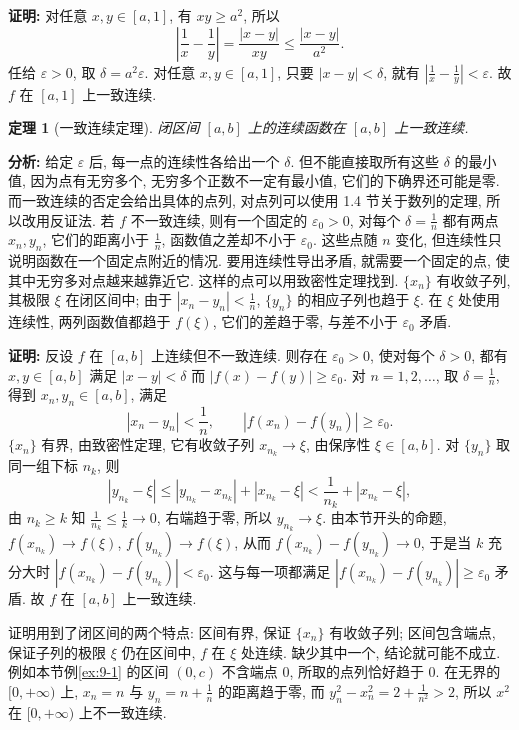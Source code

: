 \documentclass[UTF8,openany]{ctexbook}
\theoremstyle{chinesetextbook}
\newtheorem{theorem}{定理}[section]
\newenvironment{cnproof}{\par\indent\textbf{证明:} \ignorespaces}{\par}
\begin{document}
\begin{cnproof}
对任意 $x,y\in[a,1]$, 有 $xy\ge a^2$, 所以
\[
\left|\frac1x-\frac1y\right|=\frac{|x-y|}{xy}\le\frac{|x-y|}{a^2}.
\]
任给 $\varepsilon>0$, 取 $\delta=a^2\varepsilon$. 对任意 $x,y\in[a,1]$, 只要 $|x-y|<\delta$, 就有 $\displaystyle\left|\frac1x-\frac1y\right|<\varepsilon$. 故 $f$ 在 $[a,1]$ 上一致连续.
\end{cnproof}
\begin{theorem}[一致连续定理]
闭区间 $[a,b]$ 上的连续函数在 $[a,b]$ 上一致连续.
\end{theorem}
\par\indent\textbf{分析:} 给定 $\varepsilon$ 后, 每一点的连续性各给出一个 $\delta$. 但不能直接取所有这些 $\delta$ 的最小值, 因为点有无穷多个, 无穷多个正数不一定有最小值, 它们的下确界还可能是零. 而一致连续的否定会给出具体的点列, 对点列可以使用 1.4 节关于数列的定理, 所以改用反证法. 若 $f$ 不一致连续, 则有一个固定的 $\varepsilon_0>0$, 对每个 $\displaystyle\delta=\frac1n$ 都有两点 $x_n,y_n$, 它们的距离小于 $\displaystyle\frac1n$, 函数值之差却不小于 $\varepsilon_0$. 这些点随 $n$ 变化, 但连续性只说明函数在一个固定点附近的情况. 要用连续性导出矛盾, 就需要一个固定的点, 使其中无穷多对点越来越靠近它. 这样的点可以用致密性定理找到. $\{x_n\}$ 有收敛子列, 其极限 $\xi$ 在闭区间中; 由于 $\displaystyle|x_n-y_n|<\frac1n$, $\{y_n\}$ 的相应子列也趋于 $\xi$. 在 $\xi$ 处使用连续性, 两列函数值都趋于 $f(\xi)$, 它们的差趋于零, 与差不小于 $\varepsilon_0$ 矛盾.
\begin{cnproof}
反设 $f$ 在 $[a,b]$ 上连续但不一致连续. 则存在 $\varepsilon_0>0$, 使对每个 $\delta>0$, 都有 $x,y\in[a,b]$ 满足 $|x-y|<\delta$ 而 $|f(x)-f(y)|\ge\varepsilon_0$. 对 $n=1,2,\ldots$, 取 $\displaystyle\delta=\frac1n$, 得到 $x_n,y_n\in[a,b]$, 满足
\[
|x_n-y_n|<\frac1n,\qquad|f(x_n)-f(y_n)|\ge\varepsilon_0.
\]
$\{x_n\}$ 有界, 由致密性定理, 它有收敛子列 $x_{n_k}\to\xi$, 由保序性 $\xi\in[a,b]$. 对 $\{y_n\}$ 取同一组下标 $n_k$, 则
\[
|y_{n_k}-\xi|\le|y_{n_k}-x_{n_k}|+|x_{n_k}-\xi|<\frac1{n_k}+|x_{n_k}-\xi|,
\]
由 $n_k\ge k$ 知 $\displaystyle\frac1{n_k}\le\frac1k\to0$, 右端趋于零, 所以 $y_{n_k}\to\xi$. 由本节开头的命题, $f(x_{n_k})\to f(\xi)$, $f(y_{n_k})\to f(\xi)$, 从而 $f(x_{n_k})-f(y_{n_k})\to0$, 于是当 $k$ 充分大时 $|f(x_{n_k})-f(y_{n_k})|<\varepsilon_0$. 这与每一项都满足 $|f(x_{n_k})-f(y_{n_k})|\ge\varepsilon_0$ 矛盾. 故 $f$ 在 $[a,b]$ 上一致连续.
\end{cnproof}
证明用到了闭区间的两个特点: 区间有界, 保证 $\{x_n\}$ 有收敛子列; 区间包含端点, 保证子列的极限 $\xi$ 仍在区间中, $f$ 在 $\xi$ 处连续. 缺少其中一个, 结论就可能不成立. 例如本节例\ref{ex:9-1} 的区间 $(0,c)$ 不含端点 $0$, 所取的点列恰好趋于 $0$. 在无界的 $[0,+\infty)$ 上, $x_n=n$ 与 $\displaystyle y_n=n+\frac1n$ 的距离趋于零, 而 $\displaystyle y_n^2-x_n^2=2+\frac1{n^2}>2$, 所以 $x^2$ 在 $[0,+\infty)$ 上不一致连续.
\end{document}
